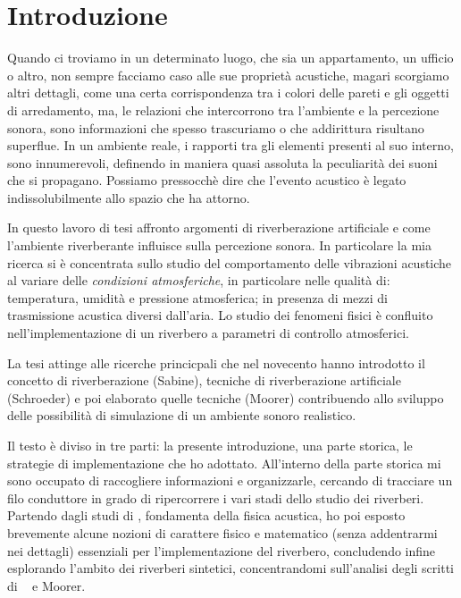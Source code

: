 \chapter*{Introduzione}
\label{chp:Introduzione}


Quando ci troviamo in un determinato luogo, che sia un appartamento, un ufficio o altro, non sempre 
facciamo caso alle sue proprietà acustiche, magari scorgiamo altri dettagli, come una certa 
corrispondenza tra i colori delle pareti e gli oggetti di arredamento, ma, le relazioni che 
intercorrono tra l’ambiente e la percezione sonora, sono informazioni che spesso trascuriamo 
o che addirittura risultano superflue.
In un ambiente reale, i rapporti tra gli elementi presenti al suo interno, sono innumerevoli, 
definendo in maniera quasi assoluta la peculiarità dei suoni che si propagano. 
Possiamo pressocchè dire che l’evento acustico è legato indissolubilmente allo spazio che ha attorno.

In questo lavoro di tesi affronto argomenti di riverberazione artificiale e
come l'ambiente riverberante influisce sulla percezione sonora. In particolare
la mia ricerca si è concentrata sullo studio del comportamento delle vibrazioni
acustiche al variare delle \emph{condizioni atmosferiche}, in particolare nelle
qualità di: temperatura, umidità e pressione atmosferica; in presenza di mezzi
di trasmissione acustica diversi dall’aria. Lo studio dei fenomeni fisici è
confluito nell'implementazione di un riverbero a parametri di controllo
atmosferici.

La tesi attinge alle ricerche princicpali che nel novecento hanno introdotto il
concetto di riverberazione (Sabine), tecniche di riverberazione artificiale
(Schroeder) e poi elaborato quelle tecniche (Moorer) contribuendo allo sviluppo
delle possibilità di simulazione di un ambiente sonoro realistico.

Il testo è diviso in tre parti: la presente introduzione, una parte storica, le
strategie di implementazione che ho adottato.
All'interno della parte storica mi sono occupato di raccogliere informazioni e organizzarle, 
cercando di tracciare un filo conduttore in grado di ripercorrere i vari stadi dello studio 
dei riverberi. Partendo dagli studi di \ws, fondamenta della fisica acustica, ho poi
esposto brevemente alcune nozioni di carattere fisico e matematico (senza addentrarmi nei dettagli) 
essenziali per l'implementazione del riverbero, concludendo infine esplorando l'ambito dei riverberi
sintetici, concentrandomi sull'analisi degli scritti di \ms~ e Moorer.

